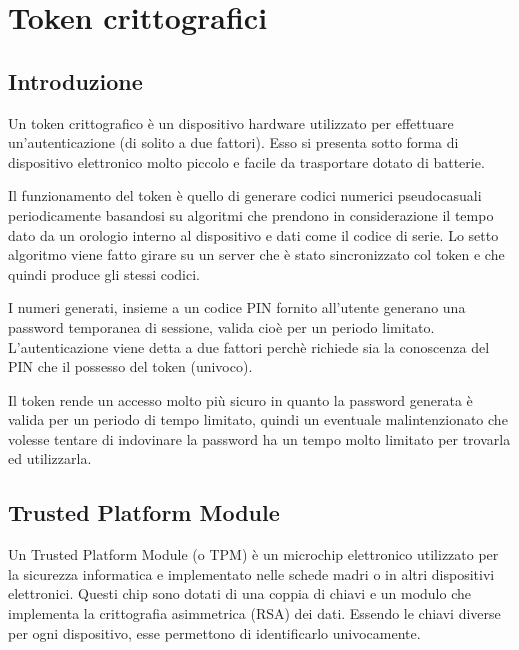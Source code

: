 \chapter{Token crittografici}
\label{chapter3}

\section{Introduzione}
Un token crittografico è un dispositivo hardware utilizzato per effettuare un'autenticazione (di solito a due fattori). Esso si presenta sotto forma di dispositivo elettronico molto piccolo e facile da trasportare dotato di batterie.

Il funzionamento del token è quello di generare codici numerici pseudocasuali periodicamente basandosi su algoritmi che prendono in considerazione il tempo dato da un orologio interno al dispositivo e dati come il codice di serie. Lo setto algoritmo viene fatto girare su un server che è stato sincronizzato col token e che quindi produce gli stessi codici.

I numeri generati, insieme a un codice PIN fornito all'utente generano una password temporanea di sessione, valida cioè per un periodo limitato. L'autenticazione viene detta a due fattori perchè richiede sia la conoscenza del PIN che il possesso del token (univoco).

Il token rende un accesso molto più sicuro in quanto la password generata è valida per un periodo di tempo limitato, quindi un eventuale malintenzionato che volesse tentare di indovinare la password ha un tempo molto limitato per trovarla ed utilizzarla.
\cite{wiki_token}

\section{Trusted Platform Module}
Un Trusted Platform Module (o TPM) è un microchip elettronico utilizzato per la sicurezza informatica e implementato nelle schede madri o in altri dispositivi elettronici. Questi chip sono dotati di una coppia di chiavi e un modulo che implementa la crittografia asimmetrica (RSA) dei dati. Essendo le chiavi diverse per ogni dispositivo, esse permettono di identificarlo univocamente.

